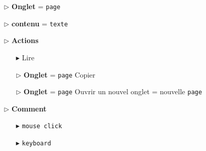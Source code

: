 \documentclass{report}
\begin{document}
\begin{multicols*}{3}
\begin{itemize}
    \begin{itemize}
      \item [$\rhd$ ] \textbf{Onglet} = \texttt{page}     
      \item [$\rhd$ ] \textbf{contenu} = \texttt{texte}     
      \item [$\rhd$ ] \textbf{Actions}     
        \begin{itemize}
          \item [$\blacktriangleright$ ]
            Lire
      \item [$\rhd$ ] \textbf{Onglet} = \texttt{page}     
            Copier 
      \item [$\rhd$ ] \textbf{Onglet} = \texttt{page}     
            Ouvrir un nouvel onglet = nouvelle \texttt{page}  
        \end{itemize}
       \item [$\rhd$ ] \textbf{Comment}      
        \begin{itemize}
          \item [$\blacktriangleright$ ] 
            \texttt{mouse click}  
          \item [$\blacktriangleright$ ] 
            \texttt{keyboard}  
        \end{itemize}
    \end{itemize}
    
    
    









    

        




    \end{itemize}





    




     


    \end{multicols*}
\end{document}
